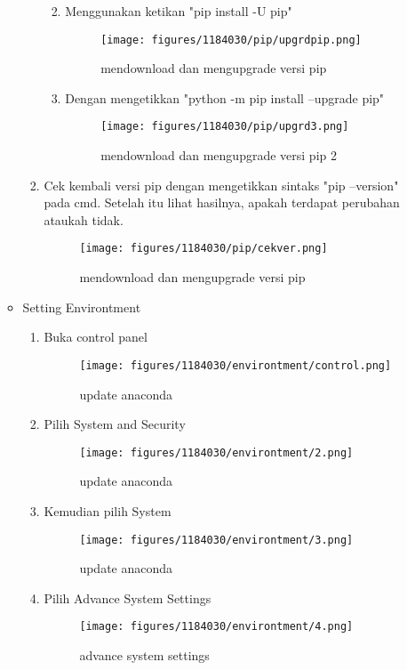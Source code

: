 \begin{enumerate}
\begin{itemize}
\begin{enumerate}
\begin{enumerate}
\begin{figure}[H]
				\end{figure}
				\item Menggunakan ketikan "pip install -U pip"
				\begin{figure}[H]
				\texttt{[image: figures/1184030/pip/upgrdpip.png]}
				\centering
				\caption{mendownload dan mengupgrade versi pip}
				\end{figure}
				\item Dengan mengetikkan "python -m pip install --upgrade pip"
				\begin{figure}[H]
				\texttt{[image: figures/1184030/pip/upgrd3.png]}
				\centering
				\caption{mendownload dan mengupgrade versi pip 2}
				\end{figure}
			\end{enumerate}
			\item Cek kembali versi pip dengan mengetikkan sintaks "pip --version" pada cmd. Setelah itu lihat hasilnya, apakah terdapat perubahan ataukah tidak.
				\begin{figure}[H]
				\texttt{[image: figures/1184030/pip/cekver.png]}
				\centering
				\caption{mendownload dan mengupgrade versi pip}
				\end{figure}
		\end{enumerate}
	\item Setting Environtment
		\begin{enumerate}
			\item Buka control panel
				\begin{figure}[H]
				\texttt{[image: figures/1184030/environtment/control.png]}
				\centering
				\caption{update anaconda}
				\end{figure}
			\item Pilih System and Security
				\begin{figure}[H]
				\texttt{[image: figures/1184030/environtment/2.png]}
				\centering
				\caption{update anaconda}
				\end{figure}
			\item Kemudian pilih System
				\begin{figure}[H]
				\texttt{[image: figures/1184030/environtment/3.png]}
				\centering
				\caption{update anaconda}
				\end{figure}
			\item Pilih Advance System Settings
				\begin{figure}[H]
				\texttt{[image: figures/1184030/environtment/4.png]}
				\centering
				\caption{advance system settings}

\end{figure}
\end{enumerate}
\end{itemize}
\end{enumerate}
